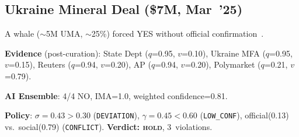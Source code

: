 \documentclass[11pt,a4paper,twocolumn]{article}
\begin{document}
\subsection{Ukraine Mineral Deal (\$7M, Mar~'25)}

A whale ($\sim$5M UMA, $\sim$25\%) forced YES without official confirmation~\cite{theblock2025}.

\textbf{Evidence} (post-curation): State Dept ($q$=0.95, $v$=0.10), Ukraine MFA ($q$=0.95, $v$=0.15), Reuters ($q$=0.94, $v$=0.20), AP ($q$=0.94, $v$=0.20), Polymarket ($q$=0.21, $v$=0.79).

\textbf{AI Ensemble}: 4/4 NO, IMA=1.0, weighted confidence=0.81.

\textbf{Policy}: $\sigma=0.43>0.30$ (\texttt{DEVIATION}), $\gamma=0.45<0.60$ (\texttt{LOW\_CONF}), official(0.13) vs.\ social(0.79) (\texttt{CONFLICT}). \textbf{Verdict: \textsc{hold}}, 3~violations.
\end{document}

